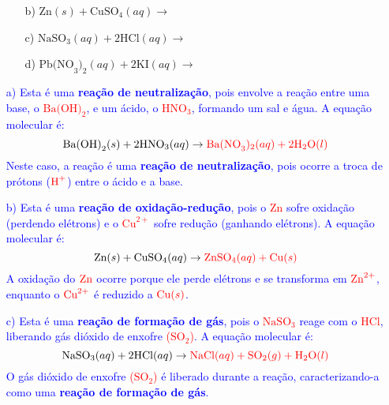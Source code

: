 \documentclass[a4paper, 12pt]{article}
\begin{document}
\begin{enumerate}
\begin{enumerate}[align=left, labelsep=-0.5em]
              \item[b)] $\text{Zn}(s) + \text{CuSO}_{4}(aq) \rightarrow$

              \item[c)] $\text{NaSO}_{3}(aq) + 2\text{HCl}(aq) \rightarrow$

              \item[d)] $\text{Pb(NO}_{3})_{2}(aq) + 2\text{KI}(aq) \rightarrow$
          \end{enumerate}
    \item[\textcolor{blue}{a)}] \textcolor{blue}{Esta é uma \textbf{reação de neutralização}, pois envolve a reação entre uma base, o \textcolor{red}{\(\text{Ba(OH)}_{2}\)}, e um ácido, o \textcolor{red}{\(\text{HNO}_{3}\)}, formando um sal e água. A equação molecular é:}
          \[
              \text{Ba(OH)}_{2}(s) + 2\text{HNO}_{3}(aq) \rightarrow \textcolor{red}{\text{Ba(NO}_{3})_{2}(aq) + 2\textcolor{red}{\text{H}_2\text{O}}(l)}
          \]
          \textcolor{blue}{Neste caso, a reação é uma \textbf{reação de neutralização}, pois ocorre a troca de prótons (\(\textcolor{red}{\text{H}^+}\)) entre o ácido e a base.}

    \item[\textcolor{blue}{b)}] \textcolor{blue}{Esta é uma \textbf{reação de oxidação-redução}, pois o \textcolor{red}{\(\text{Zn}\)} sofre oxidação (perdendo elétrons) e o \textcolor{red}{\(\text{Cu}^{2+}\)} sofre redução (ganhando elétrons). A equação molecular é:}
          \[
              \text{Zn}(s) + \text{CuSO}_{4}(aq) \rightarrow \textcolor{red}{\text{ZnSO}_{4}(aq) + \text{Cu}(s)}
          \]
          \textcolor{blue}{A oxidação do \(\textcolor{red}{\text{Zn}}\) ocorre porque ele perde elétrons e se transforma em \(\textcolor{red}{\text{Zn}^{2+}}\), enquanto o \(\textcolor{red}{\text{Cu}^{2+}}\) é reduzido a \(\textcolor{red}{\text{Cu}(s)}\).}

    \item[\textcolor{blue}{c)}] \textcolor{blue}{Esta é uma \textbf{reação de formação de gás}, pois o \textcolor{red}{\(\text{NaSO}_3\)} reage com o \textcolor{red}{\(\text{HCl}\)}, liberando gás dióxido de enxofre \textcolor{red}{($\text{SO}_{2}$)}. A equação molecular é:}
          \[
              \text{NaSO}_{3}(aq) + 2\text{HCl}(aq) \rightarrow \textcolor{red}{\text{NaCl}(aq) + \text{SO}_2(g) + \text{H}_2\text{O}(l)}
          \]
          \textcolor{blue}{O gás dióxido de enxofre \textcolor{red}{($\text{SO}_{2}$)} é liberado durante a reação, caracterizando-a como uma \textbf{reação de formação de gás}.}


\end{enumerate}
\end{document}
